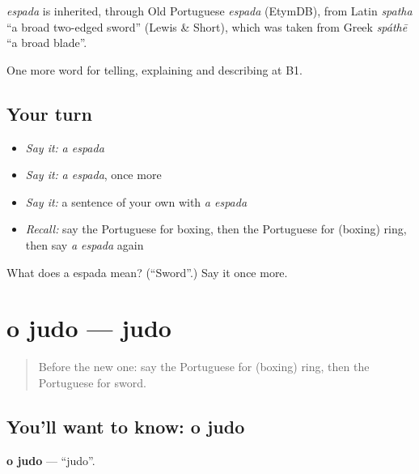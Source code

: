 \begin{cousinweb}
\emph{espada} is inherited, through Old Portuguese \emph{espada} (EtymDB), from Latin \emph{spatha} \textquotedblleft{}a broad two-edged sword\textquotedblright{} (Lewis \& Short), which was taken from Greek \emph{spáthē} \textquotedblleft{}a broad blade\textquotedblright{}.
\end{cousinweb}

\begin{grammarlens}[title={What you've built}]
One more word for telling, explaining and describing at B1.
\end{grammarlens}

\subsection*{Your turn}
\begin{itemize}
\raggedright
  \item \emph{Say it:} \emph{a espada}
  \item \emph{Say it:} \emph{a espada}, once more
  \item \emph{Say it:} a sentence of your own with \emph{a espada}
  \item \emph{Recall:} say the Portuguese for boxing, then the Portuguese for (boxing) ring, then say \emph{a espada} again
\end{itemize}

\begin{tcolorbox}[breakable,colback=teal!4,colframe=teal!35!black,title={Before you move on}]
What does a espada mean? (\textquotedblleft{}Sword\textquotedblright{}.) Say it once more.
\end{tcolorbox}
\section[o judo]{o judo — judo}

\label{lesson:PT-C514-judo}



\begin{quote}
Before the new one: say the Portuguese for (boxing) ring, then the Portuguese for sword.
\end{quote}

\subsection*{You'll want to know: o judo}
\textbf{o judo} — \textquotedblleft{}judo\textquotedblright{}.

